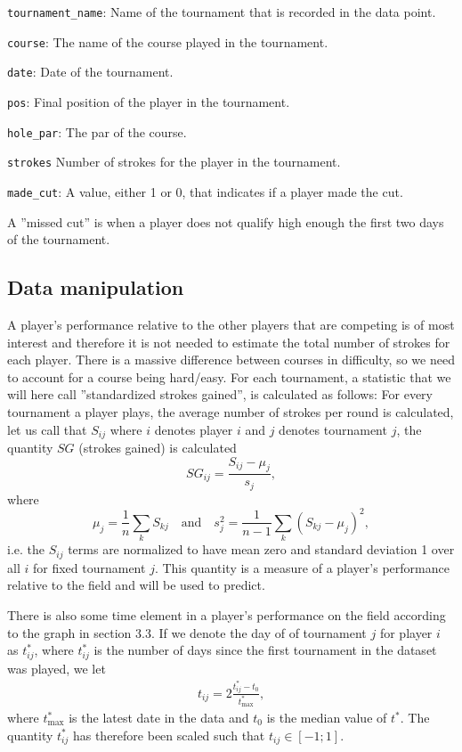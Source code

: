 \documentclass{article}\usepackage[]{graphicx}\usepackage[]{color}
\begin{document}
\hspace{4em}\verb$tournament_name$: Name of the tournament that is recorded in the data point.

\hspace{4em}\verb$course$: The name of the course played in the tournament.

\hspace{4em}\verb$date$: Date of the tournament.

\hspace{4em}\verb$pos$: Final position of the player in the tournament.

\hspace{4em}\verb$hole_par$: The par of the course.

\hspace{4em}\verb$strokes$ Number of strokes for the player in the tournament.

\hspace{4em}\verb$made_cut$: A value, either 1 or 0, that indicates if a player made the cut.
\medskip\par 
A ''missed cut'' is when a player does not qualify high enough the first two days of the tournament.
\subsection{Data manipulation}
A player's performance relative to the other players that are competing is of most interest and therefore it is not needed to estimate the total number of strokes for each player. There is a massive difference between courses in difficulty, so we need to account for a course being hard/easy. For each tournament, a statistic that we will here call ''standardized strokes gained'',  is calculated as follows: For every tournament a player plays, the average number of strokes per round is calculated, let us call that $S_{ij}$ where $i$ denotes player $i$ and $j$ denotes tournament $j$, the quantity $SG$ (strokes gained) is calculated
\[SG_{ij} = \frac{S_{ij}-\mu_j}{s_j},\]
where 
\[\mu_j = \frac1n \sum_{k}S_{kj} \quad \text{and}\quad s_j^2 = \frac{1}{n-1}\sum_{k}(S_{kj}-\mu_j)^2,\]
i.e. the $S_{ij}$ terms are normalized to have mean zero and standard deviation 1 over all $i$ for fixed tournament $j$. This quantity is a measure of a player's performance relative to the field and will be used to predict.
\medskip\par 
There is also some time element in a player's performance on the field according to the graph in section 3.3. If we denote the day of of tournament $j$ for player $i$ as $t^\ast_{ij}$, where $t^\ast_{ij}$ is the number of days since the first tournament in the dataset was played, we let
\begin{align*}
    t_{ij} = 2\frac{t_{ij}^{\ast}-t_0}{t^{\ast}_{\text{max}}},
\end{align*}
where $t^{\ast}_\text{max}$ is the latest date in the data and $t_0$ is the median value of $t^\ast$. The quantity $t_{ij}^{\ast}$ has therefore been scaled such that $t_{ij} \in [-1;1]$.
\end{document}
